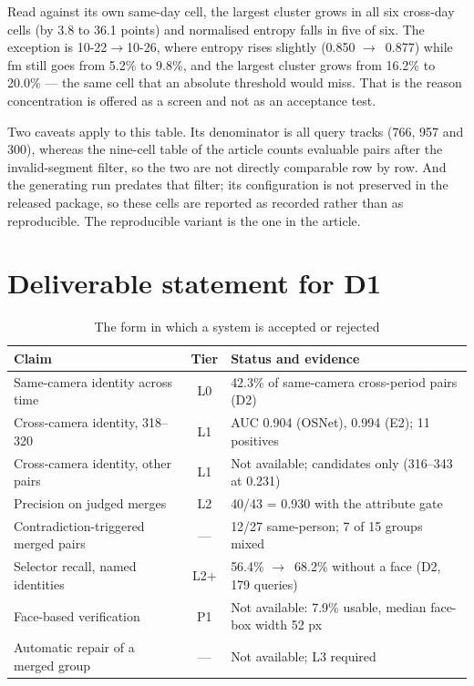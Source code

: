 \documentclass[10pt,a4paper]{article}
\newcommand{\ra}{$\rightarrow$}
\begin{document}
Read against its own same-day cell, the largest cluster grows in all six cross-day cells (by 3.8 to 36.1 points) and normalised entropy falls in five of six. The exception is 10-22\ra10-26, where entropy rises slightly (0.850 \ra\ 0.877) while fm still goes from 5.2\% to 9.8\%, and the largest cluster grows from 16.2\% to 20.0\% --- the same cell that an absolute threshold would miss. That is the reason concentration is offered as a screen and not as an acceptance test.

Two caveats apply to this table. Its denominator is all query tracks (766, 957 and 300), whereas the nine-cell table of the article counts evaluable pairs after the invalid-segment filter, so the two are not directly comparable row by row. And the generating run predates that filter; its configuration is not preserved in the released package, so these cells are reported as recorded rather than as reproducible. The reproducible variant is the one in the article.

\section{Deliverable statement for D1}
\begin{table}[h]\centering
\caption{The form in which a system is accepted or rejected}
\begin{tabular}{@{}p{4.6cm}cp{6.4cm}@{}}
\toprule
Claim & Tier & Status and evidence\\
\midrule
Same-camera identity across time & L0 & 42.3\% of same-camera cross-period pairs (D2)\\
Cross-camera identity, 318--320 & L1 & AUC 0.904 (OSNet), 0.994 (E2); 11 positives\\
Cross-camera identity, other pairs & L1 & Not available; candidates only (316--343 at 0.231)\\
Precision on judged merges & L2 & 40/43 = 0.930 with the attribute gate\\
Contradiction-triggered merged pairs & --- & 12/27 same-person; 7 of 15 groups mixed\\
Selector recall, named identities & L2+ & 56.4\% \ra\ 68.2\% without a face (D2, 179 queries)\\
Face-based verification & P1 & Not available: 7.9\% usable, median face-box width 52 px\\
Automatic repair of a merged group & --- & Not available; L3 required\\
\bottomrule
\end{tabular}
\end{table}
\end{document}
